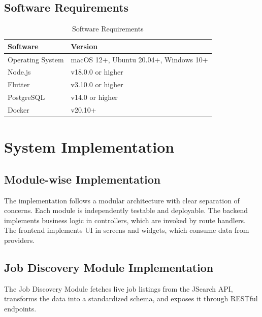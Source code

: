 \documentclass[12pt,a4paper,oneside]{report}
\begin{document}
\section{Software Requirements}

\begin{table}[H]
\centering
\caption{Software Requirements}
\label{tab:software}
\begin{tabular}{|l|l|}
\hline
\textbf{Software} & \textbf{Version} \\
\hline
Operating System & macOS 12+, Ubuntu 20.04+, Windows 10+ \\
\hline
Node.js & v18.0.0 or higher \\
\hline
Flutter & v3.10.0 or higher \\
\hline
PostgreSQL & v14.0 or higher \\
\hline
Docker & v20.10+ \\
\hline
\end{tabular}
\end{table}

\chapter{System Implementation}

\section{Module-wise Implementation}

The implementation follows a modular architecture with clear separation of concerns. Each module is independently testable and deployable. The backend implements business logic in controllers, which are invoked by route handlers. The frontend implements UI in screens and widgets, which consume data from providers.

\section{Job Discovery Module Implementation}

The Job Discovery Module fetches live job listings from the JSearch API, transforms the data into a standardized schema, and exposes it through RESTful endpoints.
\end{document}

